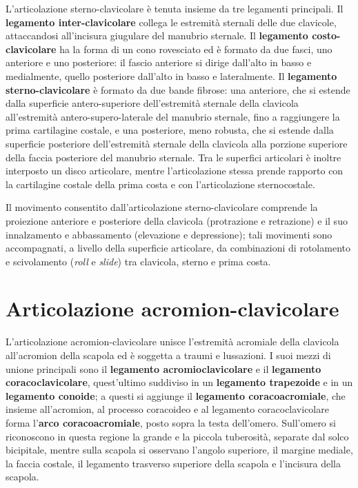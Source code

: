 L'articolazione sterno-clavicolare è tenuta insieme da tre legamenti
principali. Il \textbf{legamento inter-clavicolare} collega le estremità
sternali delle due clavicole, attaccandosi all'incisura giugulare del
manubrio sternale. Il \textbf{legamento costo-clavicolare} ha la forma di
un cono rovesciato ed è formato da due fasci, uno anteriore e uno
posteriore: il fascio anteriore si dirige dall'alto in basso e
medialmente, quello posteriore dall'alto in basso e lateralmente. Il
\textbf{legamento sterno-clavicolare} è formato da due bande fibrose: una
anteriore, che si estende dalla superficie antero-superiore dell'estremità
sternale della clavicola all'estremità antero-supero-laterale del manubrio
sternale, fino a raggiungere la prima cartilagine costale, e una
posteriore, meno robusta, che si estende dalla superficie posteriore
dell'estremità sternale della clavicola alla porzione superiore della
faccia posteriore del manubrio sternale. Tra le superfici articolari è
inoltre interposto un disco articolare, mentre l'articolazione stessa
prende rapporto con la cartilagine costale della prima costa e con
l'articolazione sternocostale.

Il movimento consentito dall'articolazione sterno-clavicolare comprende la
proiezione anteriore e posteriore della clavicola (protrazione e
retrazione) e il suo innalzamento e abbassamento (elevazione e
depressione); tali movimenti sono accompagnati, a livello della superficie
articolare, da combinazioni di rotolamento e scivolamento (\textit{roll} e
\textit{slide}) tra clavicola, sterno e prima costa.

\section{Articolazione acromion-clavicolare}

L'articolazione acromion-clavicolare unisce l'estremità acromiale della
clavicola all'acromion della scapola ed è soggetta a traumi e
lussazioni. I suoi mezzi di unione principali sono il \textbf{legamento
acromioclavicolare} e il \textbf{legamento coracoclavicolare}, quest'ultimo
suddiviso in un \textbf{legamento trapezoide} e in un \textbf{legamento
conoide}; a questi si aggiunge il \textbf{legamento coracoacromiale}, che
insieme all'acromion, al processo coracoideo e al legamento
coracoclavicolare forma l'\textbf{arco coracoacromiale}, posto sopra la
testa dell'omero. Sull'omero si riconoscono in questa regione la grande e
la piccola tuberosità, separate dal solco bicipitale, mentre sulla scapola
si osservano l'angolo superiore, il margine mediale, la faccia costale, il
legamento trasverso superiore della scapola e l'incisura della scapola.

